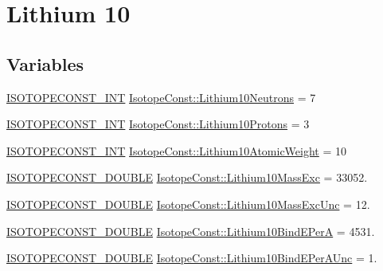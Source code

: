 \hypertarget{group___isotope_const-_lithium-_li10}{}\section{Lithium 10}
\label{group___isotope_const-_lithium-_li10}
\subsection*{Variables}
\begin{DoxyCompactItemize}
\item 
\mbox{\hyperlink{group___isotope_const-_macros_ga5f18360b3e99483a35c32d789e62621c}{I\+S\+O\+T\+O\+P\+E\+C\+O\+N\+S\+T\+\_\+\+I\+NT}} \mbox{\hyperlink{group___isotope_const-_lithium-_li10_ga46a97c741beed98aa76eb642cfe98f40}{Isotope\+Const\+::\+Lithium10\+Neutrons}} = 7
\item 
\mbox{\hyperlink{group___isotope_const-_macros_ga5f18360b3e99483a35c32d789e62621c}{I\+S\+O\+T\+O\+P\+E\+C\+O\+N\+S\+T\+\_\+\+I\+NT}} \mbox{\hyperlink{group___isotope_const-_lithium-_li10_ga7fc88650746e1f684ad9c68a7699e2ad}{Isotope\+Const\+::\+Lithium10\+Protons}} = 3
\item 
\mbox{\hyperlink{group___isotope_const-_macros_ga5f18360b3e99483a35c32d789e62621c}{I\+S\+O\+T\+O\+P\+E\+C\+O\+N\+S\+T\+\_\+\+I\+NT}} \mbox{\hyperlink{group___isotope_const-_lithium-_li10_ga06d7751c3b51e3fcc3a10ce264bd3314}{Isotope\+Const\+::\+Lithium10\+Atomic\+Weight}} = 10
\item 
\mbox{\hyperlink{group___isotope_const-_macros_ga8f45a7272ce02c0b4c65c44636ed719a}{I\+S\+O\+T\+O\+P\+E\+C\+O\+N\+S\+T\+\_\+\+D\+O\+U\+B\+LE}} \mbox{\hyperlink{group___isotope_const-_lithium-_li10_ga315401416c2338757900bbe60432f1ac}{Isotope\+Const\+::\+Lithium10\+Mass\+Exc}} = 33052.
\item 
\mbox{\hyperlink{group___isotope_const-_macros_ga8f45a7272ce02c0b4c65c44636ed719a}{I\+S\+O\+T\+O\+P\+E\+C\+O\+N\+S\+T\+\_\+\+D\+O\+U\+B\+LE}} \mbox{\hyperlink{group___isotope_const-_lithium-_li10_ga5f5e889a13e7f0de11b2d868118b59f3}{Isotope\+Const\+::\+Lithium10\+Mass\+Exc\+Unc}} = 12.
\item 
\mbox{\hyperlink{group___isotope_const-_macros_ga8f45a7272ce02c0b4c65c44636ed719a}{I\+S\+O\+T\+O\+P\+E\+C\+O\+N\+S\+T\+\_\+\+D\+O\+U\+B\+LE}} \mbox{\hyperlink{group___isotope_const-_lithium-_li10_gae5600ca166e3a0df4f189933a74db86d}{Isotope\+Const\+::\+Lithium10\+Bind\+E\+PerA}} = 4531.
\item 
\mbox{\hyperlink{group___isotope_const-_macros_ga8f45a7272ce02c0b4c65c44636ed719a}{I\+S\+O\+T\+O\+P\+E\+C\+O\+N\+S\+T\+\_\+\+D\+O\+U\+B\+LE}} \mbox{\hyperlink{group___isotope_const-_lithium-_li10_ga2f481709ad756110227c9c5a5f0a1c2e}{Isotope\+Const\+::\+Lithium10\+Bind\+E\+Per\+A\+Unc}} = 1.

\end{DoxyCompactItemize}
